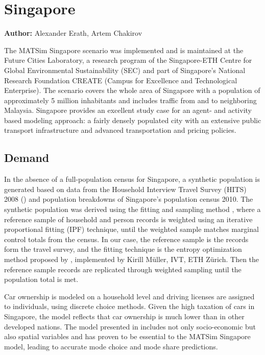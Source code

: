 \section{Singapore}
\label{ch:scenarios:singapore}
\hfill \textbf{Author:} Alexander Erath, Artem Chakirov

The MATSim Singapore scenario \citet[][]{ErathEtAl_TechRep_FCL_forth} was implemented and is maintained at the Future Cities Laboratory, a research program of the Singapore-ETH Centre for Global Environmental Sustainability (SEC) and part of Singapore's National Research Foundation CREATE (Campus for Excellence and Technological Enterprise). The scenario covers the whole area of Singapore with a population of approximately 5 million inhabitants and includes traffic from and to neighboring Malaysia. Singapore provides an excellent study case for an agent- and activity based modeling approach: a fairly densely populated city with an extensive public transport infrastructure and advanced transportation and pricing policies. 

\subsection{Demand}
In the absence of a full-population census for Singapore, a synthetic population is generated based on data from the Household Interview Travel Survey (HITS) 2008 (\citet[][]{Choi_JOUR_2010}) and population breakdowns of Singapore’s population census 2010. The synthetic population was derived using the fitting and sampling method \citep{MuellerKAxhausen_TRB_2011}, where a reference sample of household and person records  is weighted using an iterative proportional fitting (IPF) technique, until the weighted sample matches marginal control totals from the census. In our case, the reference sample is the records form the travel survey, and the fitting technique is the entropy optimization method proposed by \citet[][]{BarGeraEtAl_TRB_2009}, implemented by Kirill M\"uller, IVT, ETH Z\"urich. Then the reference sample records are replicated through weighted sampling until the population total is met. 
 
Car ownership is modeled on a household level and driving licenses are assigned to individuals, using discrete choice methods. Given the high taxation of cars in Singapore, the model reflects that car ownership is much lower than in other developed nations. The model presented in \citet[][]{VanEggermondEtAl_IATBR_2012} includes not only socio-economic but also spatial variables and has proven to be essential to the MATSim Singapore model, leading to accurate mode choice and mode share predictions. 

